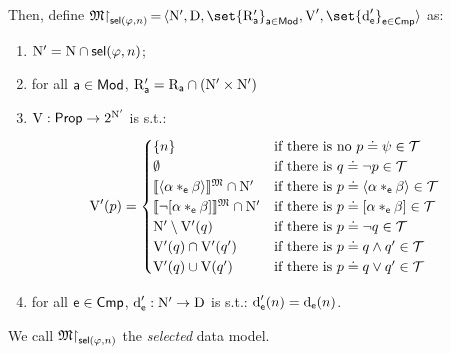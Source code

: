 \begin{definition}
\[    \]
    Then, define $\model{\restriction}_{\sel(\varphi,n)}\,{=}\,\tup{ \N', \D, \set{\R'_{\apath}}_{\apath \in \mods}, \valuation',\set{\data'_\cmp}_{\cmp \in \cmps} }$ as:
    \begin{enumerate}
        \setlength{\itemsep}{0pt}
        \item 
            $\mathrm{N}' = \mathrm{N} \cap \operatorname{\mathsf{sel}}(\varphi,n)$;
        \item 
            for all $\mathsf{a} \in \mathsf{Mod}$, $\mathrm{R}'_{\mathsf{a}} = \mathrm{R}_{\mathsf{a}} \cap (\mathrm{N}' \times \mathrm{N}')$
        \item $\operatorname{V}: \mathsf{Prop} \to 2^{\mathrm{N}'}$ is s.t.:
        \begin{align*}
            \mathrm{V}'(p) &=
                \begin{cases}
                    \{n\}
                        & \text{if there is no ${p \doteq \psi} \in \mathcal{T}$} \\
                    \emptyset
                        & \text{if there is ${q \doteq \lnot p} \in \mathcal{T}$} \\
                    \llbracket{\langle{\alpha *_{\mathsf{e}}\beta}\rangle}\rrbracket^{\mathfrak{M}} \cap \mathrm{N}'
                        & \text{if there is ${p \doteq \langle{\alpha *_{\mathsf{e}}\beta}\rangle} \in \mathcal{T}$} \\
                    \llbracket{\neg[\alpha *_{\mathsf{e}}\beta]}\rrbracket^{\mathfrak{M}} \cap \mathrm{N}'
                        & \text{if there is ${p \doteq [\alpha *_{\mathsf{e}} \beta]} \in \mathcal{T}$} \\
                    \mathrm{N}' \setminus \mathrm{V}'(q)
                        & \text{if there is ${p \doteq \lnot q} \in \mathcal{T}$} \\
                    \mathrm{V}'(q) \cap \mathrm{V}'(q')
                        & \text{if there is ${p \doteq q \land q'} \in \mathcal{T}$} \\
                    \mathrm{V}'(q) \cup \mathrm{V}(q')
                        & \text{if there is ${p \doteq q \lor q'} \in \mathcal{T}$}
                \end{cases}
        \end{align*}
        \item 
        for all $\mathsf{e} \in \mathsf{Cmp}$, $\operatorname{d}'_{\mathsf{e}}:  \mathrm{N}' \to \mathrm{D}$ is s.t.: $\operatorname{d}'_{\mathsf{e}}(n) = \operatorname{d}_{\mathsf{e}}(n)$.
    \end{enumerate}
    We call $\mathfrak{M}{\restriction}_{\operatorname{\mathsf{sel}}(\varphi,n)}$ the \emph{selected} data model.
\end{definition}

